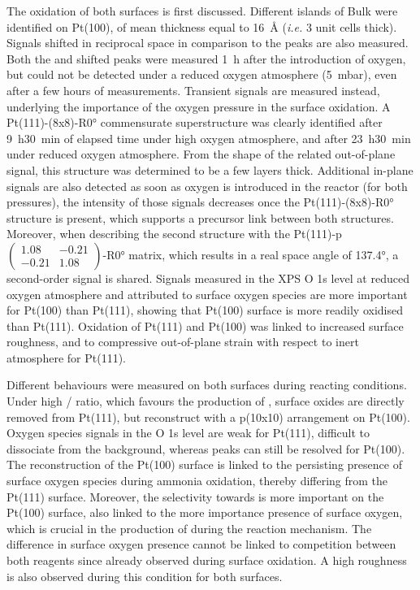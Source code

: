 The oxidation of both surfaces is first discussed.
Different islands of Bulk  were identified on Pt(100), of mean thickness equal to \qty{16}{\angstrom} (\textit{i.e.} 3 unit cells thick).
Signals shifted in reciprocal space in comparison to the  peaks are also measured.
Both the  and shifted peaks were measured \qty{1}{\hour} after the introduction of oxygen, but could not be detected under a reduced oxygen atmosphere (\qty{5}{\milli\bar}), even after a few hours of measurements.
Transient signals are measured instead, underlying the importance of the oxygen pressure in the surface oxidation.
A Pt(111)-(8x8)-R\ang{0} commensurate superstructure was clearly identified after \qty{9}{\hour}\qty{30}{\minute} of elapsed time under high oxygen atmosphere, and after \qty{23}{\hour}\qty{30}{\minute} under reduced oxygen atmosphere.
From the shape of the related out-of-plane signal, this structure was determined to be a few layers thick.
Additional in-plane signals are also detected as soon as oxygen is introduced in the reactor (for both pressures), the intensity of those signals decreases once the Pt(111)-(8x8)-R\ang{0} structure is present, which supports a precursor link between both structures.
Moreover, when describing the second structure with the Pt(111)-p$\begin{pmatrix} 1.08 & -0.21 \\ -0.21 & 1.08 \end{pmatrix}$-R\ang{0} matrix, which results in a real space angle of \ang{137.4}, a second-order signal is shared.
Signals measured in the XPS O 1s level at reduced oxygen atmosphere and attributed to surface oxygen species are more important for Pt(100) than Pt(111), showing that Pt(100) surface is more readily oxidised than Pt(111).
Oxidation of Pt(111) and Pt(100) was linked to increased surface roughness, and to compressive out-of-plane strain with respect to inert atmosphere for Pt(111).

Different behaviours were measured on both surfaces during reacting conditions.
Under high / ratio, which favours the production of , surface oxides are directly removed from Pt(111), but reconstruct with a p(10x10) arrangement on Pt(100).
Oxygen species signals in the O 1s level are weak for Pt(111), difficult to dissociate from the background, whereas peaks can still be resolved for Pt(100).
The reconstruction of the Pt(100) surface is linked to the persisting presence of surface oxygen species during ammonia oxidation, thereby differing from the Pt(111) surface.
Moreover, the selectivity towards  is more important on the Pt(100) surface, also linked to the more importance presence of surface oxygen, which is crucial in the production of  during the reaction mechanism.
The difference in surface oxygen presence cannot be linked to competition between both reagents since already observed during surface oxidation.
A high roughness is also observed during this condition for both surfaces.


